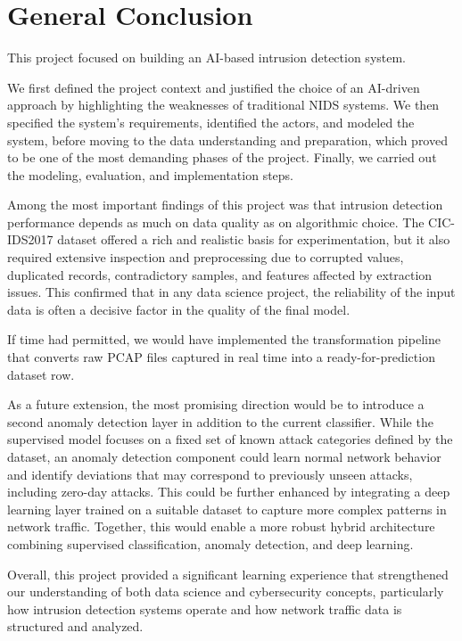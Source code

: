 \chapter*{General Conclusion}

This project focused on building an AI-based intrusion detection system.

We first defined the project context and justified the choice of an AI-driven approach by highlighting the weaknesses of traditional NIDS systems. We then specified the system’s requirements, identified the actors, and modeled the system, before moving to the data understanding and preparation, which proved to be one of the most demanding phases of the project. Finally, we carried out the modeling, evaluation, and implementation steps.

Among the most important findings of this project was that intrusion detection performance depends as much on data quality as on algorithmic choice. The CIC-IDS2017 dataset offered a rich and realistic basis for experimentation, but it also required extensive inspection and preprocessing due to corrupted values, duplicated records, contradictory samples, and features affected by extraction issues. This confirmed that in any data science project, the reliability of the input data is often a decisive factor in the quality of the final model.

If time had permitted, we would have implemented the transformation pipeline that converts raw PCAP files captured in real time into a ready-for-prediction dataset row.

As a future extension, the most promising direction would be to introduce a second anomaly detection layer in addition to the current classifier. While the supervised model focuses on a fixed set of known attack categories defined by the dataset, an anomaly detection component could learn normal network behavior and identify deviations that may correspond to previously unseen attacks, including zero-day attacks. This could be further enhanced by integrating a deep learning layer trained on a suitable dataset to capture more complex patterns in network traffic. Together, this would enable a more robust hybrid architecture combining supervised classification, anomaly detection, and deep learning.

Overall, this project provided a significant learning experience that strengthened our understanding of both data science and cybersecurity concepts, particularly how intrusion detection systems operate and how network traffic data is structured and analyzed.